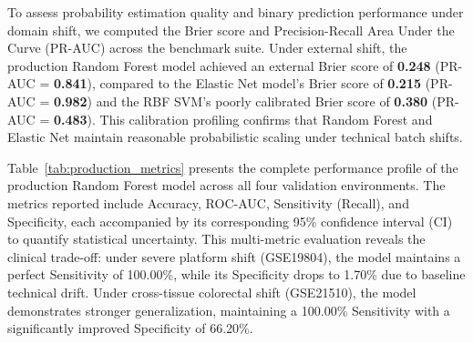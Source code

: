 \documentclass[journal,10pt]{IEEEtran}
\begin{document}
To assess probability estimation quality and binary prediction performance under domain shift, we computed the Brier score and Precision-Recall Area Under the Curve (PR-AUC) across the benchmark suite. Under external shift, the production Random Forest model achieved an external Brier score of \textbf{0.248} (PR-AUC = \textbf{0.841}), compared to the Elastic Net model's Brier score of \textbf{0.215} (PR-AUC = \textbf{0.982}) and the RBF SVM's poorly calibrated Brier score of \textbf{0.380} (PR-AUC = \textbf{0.483}). This calibration profiling confirms that Random Forest and Elastic Net maintain reasonable probabilistic scaling under technical batch shifts.

Table~\ref{tab:production_metrics} presents the complete performance profile of the production Random Forest model across all four validation environments. The metrics reported include Accuracy, ROC-AUC, Sensitivity (Recall), and Specificity, each accompanied by its corresponding 95\% confidence interval (CI) to quantify statistical uncertainty. This multi-metric evaluation reveals the clinical trade-off: under severe platform shift (GSE19804), the model maintains a perfect Sensitivity of 100.00\%, while its Specificity drops to 1.70\% due to baseline technical drift. Under cross-tissue colorectal shift (GSE21510), the model demonstrates stronger generalization, maintaining a 100.00\% Sensitivity with a significantly improved Specificity of 66.20\%.
\end{document}
